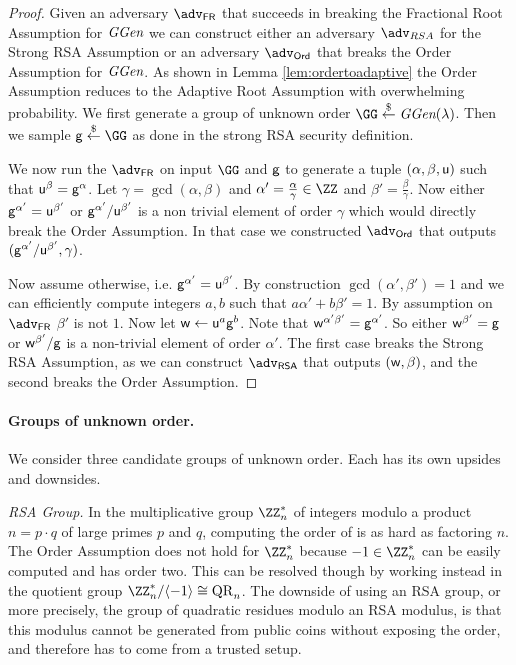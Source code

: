 \documentclass{article}
\theoremstyle{definition}
\newcommand{\alan}[1]{{\todo[color=blue!40!white]{Alan: #1}}}
\newcommand{\alan}[1]{}
\begin{document}
\begin{proof}
	Given an adversary $\adv_{\textsf{FR}}$ that succeeds in breaking the Fractional Root Assumption for $\textit{GGen}$ we can construct either an adversary $\adv_{RSA}$ for the Strong RSA Assumption or an adversary $\adv_{\textsf{Ord}}$ that breaks the Order Assumption for $\textit{GGen}$. As shown in Lemma \ref{lem:ordertoadaptive} the Order Assumption reduces to the Adaptive Root Assumption with overwhelming probability. 
	We first generate a group of unknown order $\GG \sample \ggen(\lambda)$.
	Then we sample $\gr{g}\sample \GG$ as done in the strong \textsf{RSA} security definition.
	
	We now run the $\adv_{\textsf{FR}}$ on input $\GG$ and $\mathsf{g}$ to generate a tuple $(\alpha,\beta,\mathsf{u})$ such that $\mathsf{u}^{\beta}=\mathsf{g}^{\alpha}$. Let $\gamma=\gcd(\alpha,\beta)$ and $\alpha'=\frac{\alpha}{\gamma}\in \ZZ$ and  $\beta'=\frac{\beta}{\gamma}$. Now either $\mathsf{g}^{\alpha'}=\mathsf{u}^{\beta'}$ or $\mathsf{g}^{\alpha'}/\mathsf{u}^{\beta'}$ is a non trivial element of order $\gamma$ which would directly break the Order Assumption. In that case we constructed $\adv_{\textsf{Ord}}$ that outputs $(\mathsf{g}^{\alpha'}/\mathsf{u}^{\beta'},\gamma)$.
	
	Now assume otherwise, i.e. $\mathsf{g}^{\alpha'}=\mathsf{u}^{\beta'}$. By construction $\gcd(\alpha',\beta')=1$ and we can efficiently compute integers $a,b$ such that $a \alpha'+b \beta'=1$. By assumption on $\adv_{\textsf{FR}}$ $\beta'$ is not $1$. Now let $\mathsf{w}\gets \mathsf{u}^{a}\mathsf{g}^{b}$. Note that $\mathsf{w}^{\alpha'\beta'}=\mathsf{g}^{\alpha'}$. So either $\mathsf{w}^{\beta'}=\mathsf{g}$ or $\mathsf{w}^{\beta'}/\mathsf{g}$ is a non-trivial element of order $\alpha'$. The first case breaks the Strong RSA Assumption, as we can construct $\adv_{\textsf{RSA}}$ that outputs $(\mathsf{w},\beta)$, and the second breaks the Order Assumption.
\end{proof}

\paragraph{Groups of unknown order.}
We consider three candidate groups of unknown order. Each has its own upsides and downsides.

\textit{RSA Group.} In the multiplicative group $\ZZ_n^*$ of integers modulo a product $n=p\cdot q$ of large primes $p$ and $q$, computing the order of is as hard as factoring $n$. The Order Assumption does not hold for $\ZZ_n^*$ because $-1 \in \ZZ_n^*$ can be easily computed and has order two. This can be resolved though by working instead in the quotient group $\ZZ_n^* / \langle-1\rangle \cong \mathrm{QR}_n$. %
The downside of using an RSA group, or more precisely, the group of quadratic residues modulo an RSA modulus, is that this modulus cannot be generated from public coins without exposing the order, and therefore has to come from a trusted setup.
\end{document}
